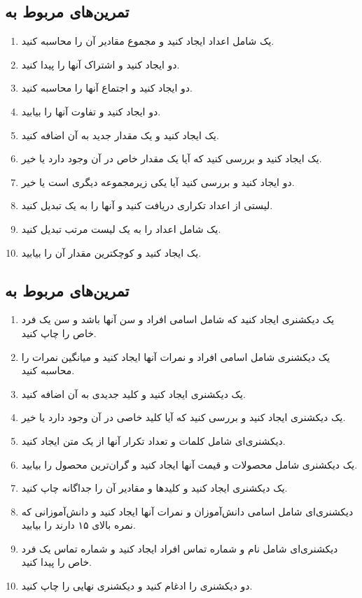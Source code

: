 \documentclass[b5paper,12pt]{article}
\begin{document}
	\subsection*{تمرین‌های مربوط به }
	
	\begin{enumerate}
		\item یک  شامل اعداد ایجاد کنید و مجموع مقادیر آن را محاسبه کنید.
		\item دو  ایجاد کنید و اشتراک آنها را پیدا کنید.
		\item دو  ایجاد کنید و اجتماع آنها را محاسبه کنید.
		\item دو  ایجاد کنید و تفاوت آنها را بیابید.
		\item یک  ایجاد کنید و یک مقدار جدید به آن اضافه کنید.
		\item یک  ایجاد کنید و بررسی کنید که آیا یک مقدار خاص در آن وجود دارد یا خیر.
		\item دو  ایجاد کنید و بررسی کنید آیا یکی زیرمجموعه دیگری است یا خیر.
		\item لیستی از اعداد تکراری دریافت کنید و آنها را به یک  تبدیل کنید.
		\item یک  شامل اعداد را به یک لیست مرتب تبدیل کنید.
		\item یک  ایجاد کنید و کوچکترین مقدار آن را بیابید.
	\end{enumerate}
	
	\subsection*{تمرین‌های مربوط به }
	
	\begin{enumerate}
		\item یک دیکشنری ایجاد کنید که شامل اسامی افراد و سن آنها باشد و سن یک فرد خاص را چاپ کنید.
		\item یک دیکشنری شامل اسامی افراد و نمرات آنها ایجاد کنید و میانگین نمرات را محاسبه کنید.
		\item یک دیکشنری ایجاد کنید و کلید جدیدی به آن اضافه کنید.
		\item یک دیکشنری ایجاد کنید و بررسی کنید که آیا کلید خاصی در آن وجود دارد یا خیر.
		\item دیکشنری‌ای شامل کلمات و تعداد تکرار آنها از یک متن ایجاد کنید.
		\item یک دیکشنری شامل محصولات و قیمت آنها ایجاد کنید و گران‌ترین محصول را بیابید.
		\item یک دیکشنری ایجاد کنید و کلیدها و مقادیر آن را جداگانه چاپ کنید.
		\item دیکشنری‌ای شامل اسامی دانش‌آموزان و نمرات آنها ایجاد کنید و دانش‌آموزانی که نمره بالای ۱۵ دارند را بیابید.
		\item دیکشنری‌ای شامل نام و شماره تماس افراد ایجاد کنید و شماره تماس یک فرد خاص را پیدا کنید.
		\item دو دیکشنری را ادغام کنید و دیکشنری نهایی را چاپ کنید.
	\end{enumerate}
	
\end{document}
